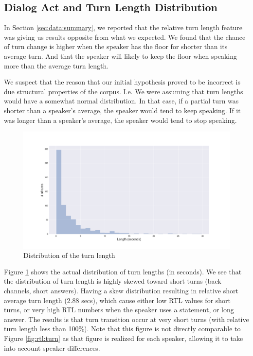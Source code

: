 \subsection{Dialog Act and Turn Length Distribution}
\label{sec:opposite}

In Section \ref {sec:data:summary}, we reported that the relative turn length feature was giving us results opposite from what we expected.  We found that the chance of turn change is higher when the speaker has the floor for shorter than its average turn. And that the speaker will likely to keep the floor when speaking more than the average turn length. 

We suspect that the reason that our initial hypothesis proved to be incorrect is due structural properties of the corpus. I.e. We were assuming that turn lengths would have a somewhat normal distribution.  In that case, if a partial turn was shorter than a speaker's average, the speaker would tend to keep speaking.  If it was longer than a speaker's average, the speaker would tend to stop speaking.

\begin{figure}[ht!]
\centering
\includegraphics[width=\textwidth]{../scikitlearn/figures/f10.png}\vspace{-0.5em}
\caption{Distribution of the turn length}
\label{fig:turn_dist}
\end{figure}
%
Figure \ref {fig:turn_dist} shows the actual distribution of turn lengths (in seconds).
We see that the distribution of turn length is highly skewed toward short turns (back channels, short answers). Having a skew distribution resulting in relative short average turn length (2.88 secs), which cause either low RTL values for short turns, or very high RTL numbers when the speaker uses a statement, or long answer. The results is that turn transition occur at very short turns (with relative turn length less than 100\%). Note that this figure is not directly comparable to Figure \ref {fig:rtl:turn} as that figure is realized for each speaker, allowing it to take into account speaker differences.




